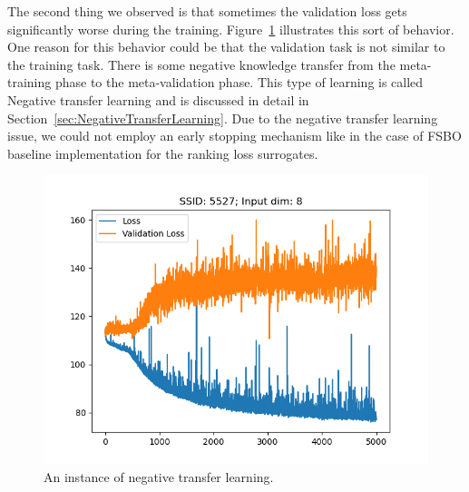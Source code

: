 \documentclass[12pt, twoside, ngerman]{report}
\begin{document}
The second thing we observed is that sometimes the validation loss gets significantly worse during the training. Figure~\ref{fig:NegativeTransferLearning} illustrates this sort of behavior. One reason for this behavior could be that the validation task is not similar to the training task.
There is some negative knowledge transfer from the meta-training phase to the meta-validation phase. This type of learning is called Negative transfer learning and is discussed in detail in Section~\ref{sec:NegativeTransferLearning}.
Due to the negative transfer learning issue, we could not employ an early stopping mechanism like in the case of FSBO baseline implementation for the ranking loss surrogates.

\begin{figure}[h]
  \centering
    \includegraphics[scale=0.40]{images/NegativeTransferLearning}
    \caption{An instance of negative transfer learning.}
    \label{fig:NegativeTransferLearning}
\end{figure}
\end{document}
